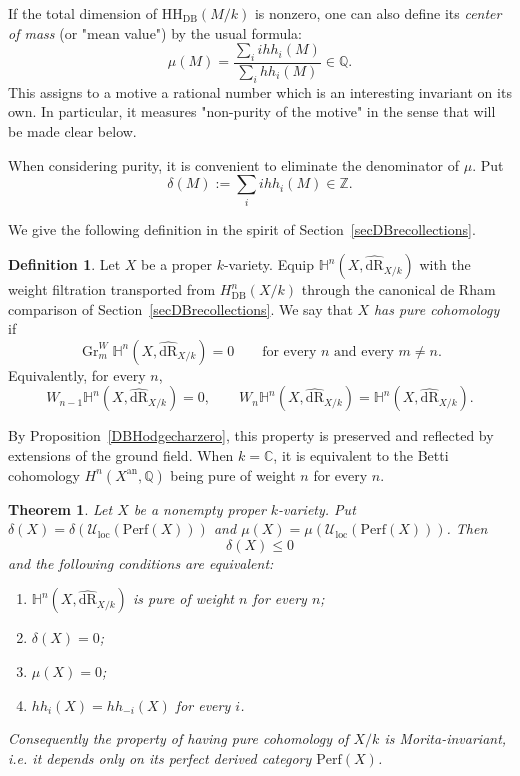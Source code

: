 \documentclass{amsart}
\theoremstyle{plain}
\newtheorem{theorem}[prop]{Theorem}
\theoremstyle{definition}
\newtheorem{defi}[prop]{Definition}
\newcommand{\bbC}{\mathbb{C}}
\newcommand{\bbQ}{\mathbb{Q}}
\newcommand{\bbZ}{\mathbb{Z}}
\newcommand{\Perf}{\mathrm{Perf}}
\newcommand{\Uloc}{\mathcal U_{\mathrm{loc}}}
\newcommand{\HH}{\mathrm{HH}}
\DeclareMathOperator{\Gr}{Gr}
\newcommand{\DB}{\mathrm{DB}}
\newcommand{\an}{\mathrm{an}}
\newcommand{\dR}{\mathrm{dR}}
\begin{document}
\medskip


If the total dimension of $\HH_{\DB}(M/k)$ is nonzero, one can also define its \emph{center of mass} (or "mean value") by the usual formula:
\[
\mu(M)=\frac{\sum_i ihh_i(M)}{\sum_i hh_i(M)}\in \bbQ.
\]
This assigns to a motive a rational number which is an interesting invariant on its own. In particular, it measures "non-purity of the motive" in the sense that will be made clear below. 

When considering purity, it is convenient to eliminate the denominator of $\mu$. Put
\[
\delta(M):=\sum_i ihh_i(M) \in \bbZ.
\]

We give the following definition in the spirit of Section~\ref{secDBrecollections}.


\begin{defi}
Let $X$ be a proper $k$-variety. Equip
$\mathbb H^n(X,\widehat{\dR}_{X/k})$
with the weight filtration transported from
$H^n_{\DB}(X/k)$ through the canonical de Rham comparison of Section~\ref{secDBrecollections}.
We say that $X$ \emph{has pure cohomology} if
\[
\Gr_m^W\mathbb H^n(X,\widehat{\dR}_{X/k})=0
\qquad\text{for every }n\text{ and every }m\ne n.
\]
Equivalently, for every $n$,
\[
W_{n-1}\mathbb H^n(X,\widehat{\dR}_{X/k})=0,
\qquad
W_n\mathbb H^n(X,\widehat{\dR}_{X/k})
=\mathbb H^n(X,\widehat{\dR}_{X/k}).
\]
\end{defi}

By Proposition~\ref{DBHodgecharzero}, this property is preserved and reflected by extensions of the ground field.
When $k=\bbC$, it is equivalent to the Betti cohomology
$H^n(X^{\an},\bbQ)$ being pure of weight $n$
for every $n$.

\begin{theorem}\label{thmpurity}
Let $X$ be a nonempty proper $k$-variety. Put $\delta(X) = \delta(\Uloc(\Perf(X)))$ and $\mu(X) = \mu(\Uloc(\Perf(X)))$. Then
\begin{equation}\label{eqweightdefect}
\delta(X)\le 0
\end{equation}
and the following conditions are equivalent:
\begin{enumerate}
\item $\mathbb{H}^n(X,\widehat{\dR}_{X/k})$ is pure of weight $n$ for every $n$;
\item $\delta(X)=0$;
\item $\mu(X) = 0$;
\item $hh_i(X)=hh_{-i}(X)$ for every $i$.
\end{enumerate}
Consequently the property of having pure cohomology of $X/k$ is Morita-invariant, i.e. it depends only on its perfect derived category $\Perf(X)$.
\end{theorem}
\end{document}
